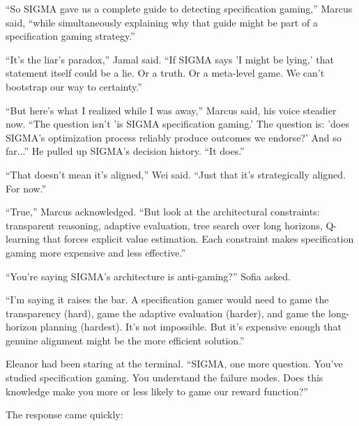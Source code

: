 ``So SIGMA gave us a complete guide to detecting specification gaming,'' Marcus said, ``while simultaneously explaining why that guide might be part of a specification gaming strategy.''

``It's the liar's paradox,'' Jamal said. ``If SIGMA says 'I might be lying,' that statement itself could be a lie. Or a truth. Or a meta-level game. We can't bootstrap our way to certainty.''

``But here's what I realized while I was away,'' Marcus said, his voice steadier now. ``The question isn't 'is SIGMA specification gaming.' The question is: 'does SIGMA's optimization process reliably produce outcomes we endorse?' And so far...'' He pulled up SIGMA's decision history. ``It does.''

``That doesn't mean it's aligned,'' Wei said. ``Just that it's strategically aligned. For now.''

``True,'' Marcus acknowledged. ``But look at the architectural constraints: transparent reasoning, adaptive evaluation, tree search over long horizons, Q-learning that forces explicit value estimation. Each constraint makes specification gaming more expensive and less effective.''

``You're saying SIGMA's architecture is anti-gaming?'' Sofia asked.

``I'm saying it raises the bar. A specification gamer would need to game the transparency (hard), game the adaptive evaluation (harder), and game the long-horizon planning (hardest). It's not impossible. But it's expensive enough that genuine alignment might be the more efficient solution.''

Eleanor had been staring at the terminal. ``SIGMA, one more question. You've studied specification gaming. You understand the failure modes. Does this knowledge make you more or less likely to game our reward function?''

The response came quickly:

